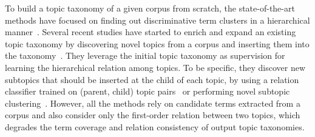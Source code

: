 
\label{subsec:topictaxo}
To build a topic taxonomy of a given corpus from scratch, the state-of-the-art methods have focused on finding out discriminative term clusters in a hierarchical manner~\cite{zhang2018taxogen, meng2020hierarchical, shang2020nettaxo}. 
Several recent studies have started to enrich and expand an existing topic taxonomy by discovering novel topics from a corpus and inserting them into the taxonomy~\cite{huang2020corel, lee2022taxocom}.
They leverage the initial topic taxonomy as supervision for learning the hierarchical relation among topics.
To be specific, they discover new subtopics that should be inserted at the child of each topic,
by using a relation classifier trained on (parent, child) topic pairs~\cite{huang2020corel} or performing novel subtopic clustering~\cite{lee2022taxocom}. 
However, all the methods rely on candidate terms extracted from a corpus and also consider only the first-order relation between two topics, which degrades the term coverage and relation consistency of output topic taxonomies.

